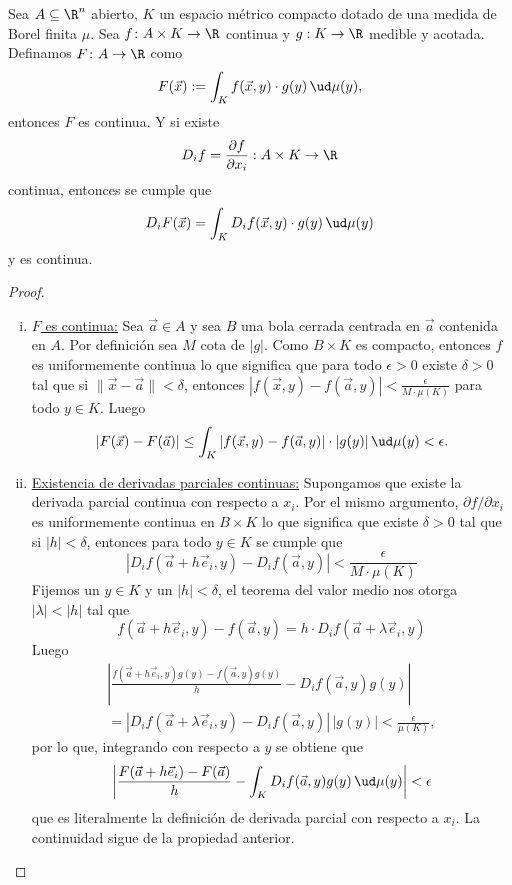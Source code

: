 \begin{thm}
	Sea $A\subseteq\R^n$ abierto, $K$ un espacio métrico compacto dotado de una medida de Borel finita $\mu$.
	Sea $f\colon A\times K \to \R$ continua y $g:K \to \R$ medible y acotada.
	Definamos $F\colon A \to \R$ como
	$$ F(\vec x) := \int_K f(\vec x, y)\cdot g(y) \, \ud\mu(y), $$
	entonces $F$ es continua. Y si existe
	$$ D_if = \frac{\partial f}{\partial x_i} : A\times K \to \R $$
	continua, entonces se cumple que
	$$ D_i F(\vec x) = \int_K D_i f(\vec x, y)\cdot g(y) \, \ud\mu(y) $$
	y es continua.
\end{thm}
\begin{proof}
	\begin{enumerate}[i)]
		\item \underline{$F$ es continua:}
			Sea $\vec a\in A$ y sea $B$ una bola cerrada centrada en $\vec a$ contenida en $A$.
			Por definición sea $M$ cota de $|g|$.
			Como $B\times K$ es compacto, entonces $f$ es uniformemente continua lo que significa que para todo $\epsilon > 0$
			existe $\delta > 0$ tal que si $\|\vec x - \vec a\| < \delta$, entonces $|f(\vec x, y) - f(\vec a, y)| < \frac{\epsilon}{M \cdot \mu(K)}$
			para todo $y\in K$. Luego
			$$ |F(\vec x) - F(\vec a)| \le \int_K |f(\vec x, y) - f(\vec a, y)| \cdot |g(y)| \, \ud\mu(y) < \epsilon. $$

		\item \underline{Existencia de derivadas parciales continuas:}
			Supongamos que existe la derivada parcial continua con respecto a $x_i$.
			Por el mismo argumento, $\partial f/\partial x_i$ es uniformemente continua en $B\times K$ lo que significa que
			existe $\delta > 0$ tal que si $|h| < \delta$, entonces para todo $y\in K$ se cumple que
			$$ | D_if(\vec a + h\vec e_i, y) - D_if(\vec a, y) | < \frac{\epsilon}{M\cdot\mu(K)} $$
			Fijemos un $y\in K$ y un $|h| < \delta$, el teorema del valor medio nos otorga $|\lambda| < |h|$ tal que
			$$ f(\vec a + h\vec e_i, y) - f(\vec a, y) = h\cdot D_i f(\vec a + \lambda\vec e_i, y) $$
			Luego
			\begin{multline*}
				\left| \frac{f(\vec a + h\vec e_i, y)g(y) - f(\vec a, y)g(y)}{h} - D_if(\vec a, y)g(y) \right| \\
				= \left| D_i f(\vec a + \lambda\vec e_i, y) - D_if(\vec a, y) \right| \, |g(y)| < \frac{\epsilon}{\mu(K)},
			\end{multline*} 
			por lo que, integrando con respecto a $y$ se obtiene que
			$$ \left| \frac{F(\vec a + h\vec e_i) - F(\vec a)}{h} - \int_K D_if(\vec a, y)g(y)\,\ud\mu(y) \right| < \epsilon $$
			que es literalmente la definición de derivada parcial con respecto a $x_i$.
			La continuidad sigue de la propiedad anterior. \qedhere
	\end{enumerate}
\end{proof}


